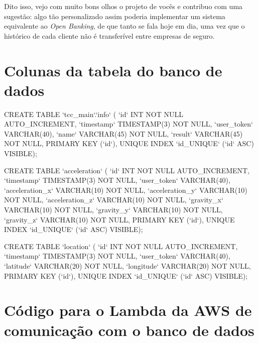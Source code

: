 \noindent
Dito isso, vejo com muito bons olhos o projeto de vocês e contribuo com uma sugestão: algo tão personalizado assim poderia implementar um sistema equivalente ao \textit{Open Banking}, de que tanto se fala hoje em dia, uma vez que o histórico de cada cliente não é transferível entre empresas de seguro.



\section{Colunas da tabela do banco de dados}

\begin{python}
CREATE TABLE `tcc_main`.`info` (
  `id` INT NOT NULL AUTO_INCREMENT, 
  `timestamp` TIMESTAMP(3) NOT NULL,
  `user_token` VARCHAR(40),
  `name` VARCHAR(45) NOT NULL,
  `result` VARCHAR(45) NOT NULL,
  PRIMARY KEY (`id`),
  UNIQUE INDEX `id_UNIQUE` (`id` ASC) VISIBLE);

CREATE TABLE `acceleration` (
  `id` INT NOT NULL AUTO_INCREMENT,
  `timestamp` TIMESTAMP(3) NOT NULL,
  `user_token` VARCHAR(40),
  `acceleration_x` VARCHAR(10) NOT NULL,
  `acceleration_y` VARCHAR(10) NOT NULL,
  `acceleration_z` VARCHAR(10) NOT NULL,
  `gravity_x` VARCHAR(10) NOT NULL,
  `gravity_y` VARCHAR(10) NOT NULL,
  `gravity_z` VARCHAR(10) NOT NULL,
  PRIMARY KEY (`id`),
  UNIQUE INDEX `id_UNIQUE` (`id` ASC) VISIBLE);

CREATE TABLE `location` (
  `id` INT NOT NULL AUTO_INCREMENT,
  `timestamp` TIMESTAMP(3) NOT NULL,
  `user_token` VARCHAR(40),
  `latitude` VARCHAR(20) NOT NULL,
  `longitude` VARCHAR(20) NOT NULL,
  PRIMARY KEY (`id`),
  UNIQUE INDEX `id_UNIQUE` (`id` ASC) VISIBLE);

\end{python}





\section{Código para o Lambda da AWS de comunicação com o banco de dados}

